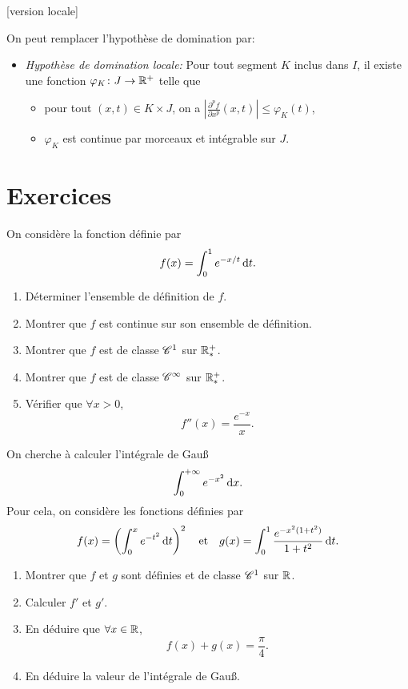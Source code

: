 \documentclass{yann}
\begin{document}
[version locale]

On peut remplacer l'hypothèse de domination par:
\begin{itemize}
\item
\emph{Hypothèse de domination locale:}
  Pour tout segment $K$ inclus dans $I$,
  il existe une fonction $\varphi_K \colon J \to \mathbb{R}^+$ telle que

  \begin{itemize}
  \item
pour tout $(x,t)\in K\times J$,
    on a $\left| \frac{\partial^p f}{\partial x^p} (x,t) \right| \leq \varphi_K(t)$,
  \item
$\varphi_K$ est continue par morceaux et intégrable sur $J$.
  \end{itemize}
\end{itemize}

\section{Exercices}

\Exercice

On considère la fonction définie par \[ f(x) = \int_0^1 e^{-x/t} \mathop{}\!\mathrm{d} t. \]
\begin{enumerate}
\item
Déterminer l'ensemble de définition de $f$.
\item
Montrer que $f$ est continue sur son ensemble de définition.
\item
Montrer que $f$ est de classe $\mathscr{C}^{1}$ sur $\mathbb{R}^+_*$.
\item
Montrer que $f$ est de classe $\mathscr{C}^{\infty}$ sur $\mathbb{R}^+_*$.
\item
Vérifier que $\forall x > 0$, \[ f''(x) = \frac{e^{-x}}{x}. \]
\end{enumerate}

\Exercice

On cherche à calculer l'intégrale de Gauß
\[ \int_0^{+\infty} e^{-x^2} \mathop{}\!\mathrm{d} x. \]
Pour cela, on considère les fonctions définies par
\[ f(x) = \left(\int_0^x e^{-t^2} \mathop{}\!\mathrm{d} t \right)^2
\quad\text{et}\quad
g(x) = \int_0^1 \frac{e^{-x^2(1+t^2)}}{1+t^2} \mathop{}\!\mathrm{d} t. \]
\begin{enumerate}
\item
Montrer que $f$ et $g$ sont définies et de classe $\mathscr{C}^{1}$ sur $\mathbb{R}$.
\item
Calculer $f'$ et $g'$.
\item
En déduire que $\forall x\in\mathbb{R}$, \[ f(x) + g(x) = \frac\pi4. \]
\item
En déduire la valeur de l'intégrale de Gauß.
\end{enumerate}
\end{document}
